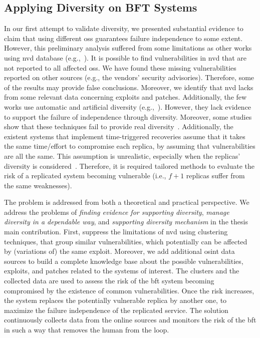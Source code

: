 \subsection{Applying Diversity on BFT Systems}
In our first attempt to validate diversity, we presented substantial evidence to claim that using different \glspl{os} guarantees failure independence to some extent.
However, this preliminary analysis suffered from some limitations as other works using \gls{nvd} database (e.g.,~\cite{Gorbenko:2011,Han:2009,Frei:2010,Shahzad:2012,Bozorgi:2010,Allodi:2014,Gorbenko:2017}).
It is possible to find vulnerabilities in \gls{nvd} that are not reported to all affected \glspl{os}.
We have found these missing vulnerabilities reported on other sources (e.g., the vendors' security advisories).
Therefore, some of the results may provide false conclusions.
Moreover, we identify that \gls{nvd} lacks from some relevant data concerning exploits and patches.
Additionally, the few works use automatic and artificial diversity (e.g.,~\cite{Roeder:2010,Amir:2011}). 
However, they lack evidence to support the failure of independence through diversity. 
Moreover, some studies show that these techniques fail to provide real diversity~\cite{Snow:2013,Bittau:2014}. 
Additionally, the existent systems that implement time-triggered recoveries assume that it takes the same time/effort to compromise each replica, by assuming that vulnerabilities are all the same. 
This assumption is unrealistic, especially when the replicas' diversity is considered~\cite{Nayak:2014}. 
Therefore, it is required tailored methods to evaluate the risk of a replicated system becoming vulnerable (i.e., $f+1$ replicas suffer from the same weaknesses).



The problem is addressed from both a theoretical and practical perspective.
We address the problems of \emph{finding evidence for supporting diversity}, \emph{manage diversity in a dependable way}, and \emph{supporting diversity mechanism} in the thesis main contribution.
First, suppress the limitations of \gls{nvd} using clustering techniques, that group similar vulnerabilities, which potentially can be affected by (variations of) the same exploit.
Moreover, we add additional \gls{osint} data sources to build a complete knowledge base about the possible vulnerabilities, exploits, and patches related to the systems of interest. 
The clusters and the collected data are used to assess the risk of the \gls{bft} system becoming compromised by the existence of common vulnerabilities.
Once the risk increases, the system replaces the potentially vulnerable replica by another one, to maximize the failure independence of the replicated service.
The solution continuously collects data from the online sources and monitors the risk of the \gls{bft} in such a way that removes the human from the loop.

